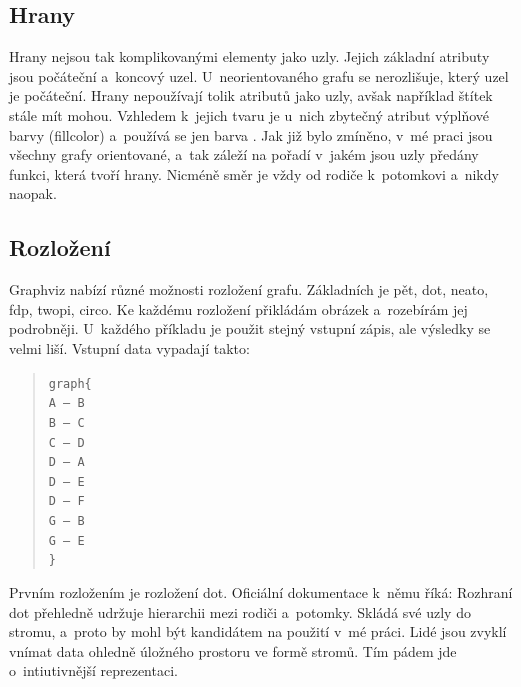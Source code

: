 \documentclass[color,table,oneside,nolot,nolof]{fithesis}
\begin{document}
\subsection{Hrany}
	Hrany nejsou tak komplikovanými elementy jako uzly. Jejich základní atributy jsou počáteční a~koncový uzel. U~neorientovaného grafu se nerozlišuje, který uzel je počáteční. Hrany 
	nepoužívají tolik atributů jako uzly, avšak například štítek stále mít mohou. Vzhledem k~jejich tvaru je u~nich zbytečný atribut výplňové barvy (fillcolor) a~používá se jen barva 
	.
	Jak již bylo zmíněno, v~mé praci jsou všechny grafy orientované, a~tak záleží na pořadí v~jakém jsou uzly předány funkci, která tvoří hrany. Nicméně směr je vždy od rodiče k~potomkovi
	a~nikdy naopak.
	
\subsection{Rozložení}
	Graphviz nabízí různé možnosti rozložení grafu. Základních je pět, dot, neato, fdp, twopi, circo. Ke každému rozložení přikládám obrázek a~rozebírám jej 
	podrobněji. U~každého příkladu je použit stejný vstupní zápis, ale výsledky se velmi liší. Vstupní data vypadají takto:
	\begin{quotation}
		\texttt{graph\{\\
		A -- B\\
		B -- C\\
		C -- D\\
		D -- A\\
		D -- E\\
		D -- F\\
		G -- B\\
		G -- E\\
	\}}
	\end{quotation}

	Prvním rozložením je rozložení dot. Oficiální dokumentace k~němu říká:
	\cite{graphviz_layout} 
	Rozhraní dot přehledně udržuje hierarchii mezi rodiči a~potomky. Skládá
	své uzly do stromu, a~proto by mohl být kandidátem na použití v~mé práci. Lidé jsou zvyklí vnímat data ohledně úložného prostoru ve formě stromů. Tím pádem jde o~intiutivnější
	reprezentaci.
\end{document}
